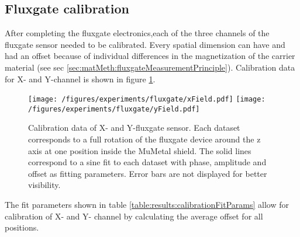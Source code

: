     \subsection{Fluxgate calibration}
    \label{sec:res:fluxgateCalibration}
    After completing the fluxgate electronics,each of the three channels of the fluxgate sensor needed to be calibrated. Every spatial dimension can have and had an offset because of individual differences in the magnetization of the carrier material  (see sec \ref{sec:matMeth:fluxgateMeasurementPrinciple}). Calibration data for X- and Y-channel is shown in figure \ref{fig:results:fluxgate:xysinus}.
        \begin{figure}
            \centering
            \texttt{[image: /figures/experiments/fluxgate/xField.pdf]}
            \texttt{[image: /figures/experiments/fluxgate/yField.pdf]}
            \caption[Calibration results X/Y]{Calibration data of X- and Y-fluxgate sensor. Each dataset corresponds to a full rotation of the fluxgate device around the z axis at one position inside the MuMetal shield. The solid lines correspond to a sine fit to each dataset with phase, amplitude and offset as fitting parameters. Error bars are not
                \label{fig:results:fluxgate:xysinus}
            displayed for better visibility.}
        \end{figure}
        The fit parameters shown in table \ref{table:results:calibrationFitParams} allow for calibration of X- and Y- channel by calculating the average offset for all positions.
